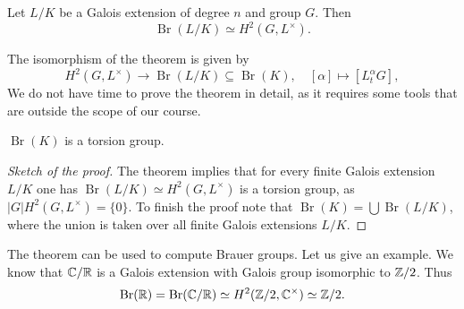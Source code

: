 
\begin{theorem}
    Let $L/K$ be a Galois extension of degree $n$ and group $G$. Then
    \[
    \operatorname{Br}(L/K)\simeq H^2(G,L^{\times}).
    \]
\end{theorem}

The isomorphism of the theorem is given by 
    \[
    H^2(G,L^{\times})\to\operatorname{Br}(L/K)\subseteq\operatorname{Br}(K),
    \quad
    [\alpha]\mapsto [L_t^{\alpha}G],
    \]
We do not have time to prove the theorem in detail, as it requires
some tools that are outside the scope of our course. 

\begin{corollary}
    $\operatorname{Br}(K)$ is a torsion group.
\end{corollary}

\begin{proof}[Sketch of the proof]
    The theorem implies that for every finite Galois extension $L/K$
    one has $\operatorname{Br}(L/K)\simeq H^2(G,L^{\times})$ is a torsion group, 
    as $|G|H^2(G,L^{\times})=\{0\}$. To finish the proof note that
    $\operatorname{Br}(K)=\bigcup\operatorname{Br}(L/K)$, where the union 
    is taken over all finite Galois extensions $L/K$. 
\end{proof}

The theorem can be used to compute Brauer groups. Let us give an example. We know
that $\mathbb{C}/\mathbb{R}$ is a Galois extension with Galois group isomorphic to $\mathbb{Z}/2$. Thus
\[
\operatorname{Br}(\mathbb{R})=\operatorname{Br}(\mathbb{C}/\mathbb{R})\simeq H^2(\mathbb{Z}/2,\mathbb{C}^{\times})\simeq\mathbb{Z}/2.
\]


